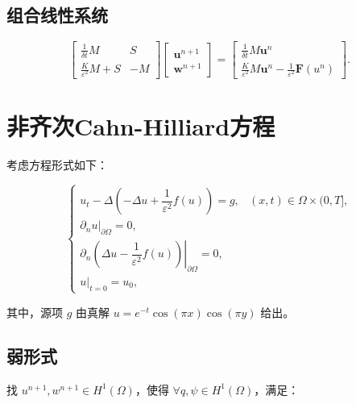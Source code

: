 \documentclass[12pt,a4paper]{article}
\begin{document}
\subsection{组合线性系统}

\[
\begin{bmatrix}
	\frac{1}{\delta t} M & S \\
	\frac{K}{\varepsilon^2} M + S & -M
\end{bmatrix}
\begin{bmatrix}
	\mathbf{u}^{n+1} \\
	\mathbf{w}^{n+1}
\end{bmatrix}
=
\begin{bmatrix}
	\frac{1}{\delta t} M \mathbf{u}^n \\
	\frac{K}{\varepsilon^2} M \mathbf{u}^n - \frac{1}{\varepsilon^2} \mathbf{F}(u^n)
\end{bmatrix}.
\]

%

\section{非齐次Cahn-Hilliard方程}

考虑方程形式如下：

\begin{equation}
	\begin{cases}
		u_t - \Delta\left(-\Delta u + \dfrac{1}{\varepsilon^2} f(u)\right) = g, & (x, t) \in \Omega \times (0, T], \\
		\left.\partial_n u\right|_{\partial \Omega} = 0, \\
		\left.\partial_n\left(\Delta u - \dfrac{1}{\varepsilon^2} f(u)\right)\right|_{\partial \Omega} = 0, \\
		u|_{t=0} = u_0,
	\end{cases}
\end{equation}

其中，源项 \( g \) 由真解 \( u = e^{-t} \cos(\pi x) \cos(\pi y) \) 给出。

\subsection{弱形式}

找 \( u^{n+1}, w^{n+1} \in H^1(\Omega) \)，使得 \( \forall q, \psi \in H^1(\Omega) \)，满足：
\end{document}
